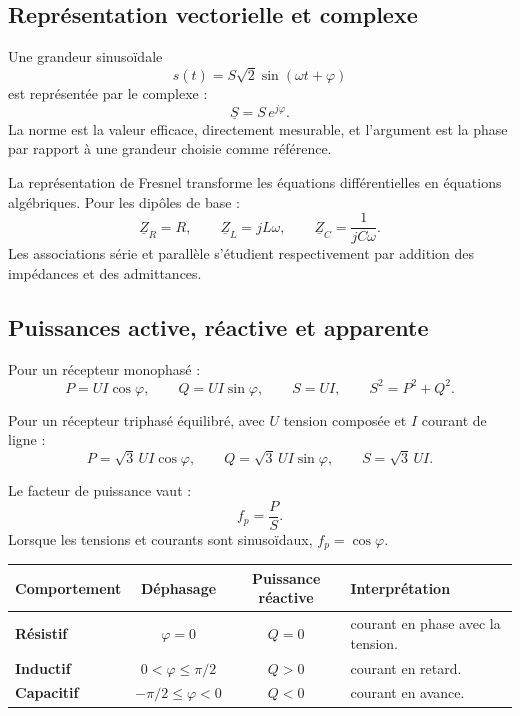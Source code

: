 \subsection{Représentation vectorielle et complexe}

Une grandeur sinusoïdale
\[
s(t)=S\sqrt2\sin(\omega t+\varphi)
\]
est représentée par le complexe :
\[
\boxed{\underline S=S\,e^{j\varphi}.}
\]
La norme est la valeur efficace, directement mesurable, et l'argument est la phase par rapport à une grandeur choisie comme référence.

\begin{center}\TLTriphasageVectoriel\end{center}

La représentation de Fresnel transforme les équations différentielles en équations algébriques. Pour les dipôles de base :
\[
\underline Z_R=R,
\qquad
\underline Z_L=jL\omega,
\qquad
\underline Z_C=\frac{1}{jC\omega}.
\]
Les associations série et parallèle s'étudient respectivement par addition des impédances et des admittances.


\subsection{Puissances active, réactive et apparente}

Pour un récepteur monophasé :
\[
P=UI\cos\varphi,
\qquad
Q=UI\sin\varphi,
\qquad
S=UI,
\qquad
S^2=P^2+Q^2.
\]

Pour un récepteur triphasé équilibré, avec $U$ tension composée et $I$ courant de ligne :
\[
\boxed{P=\sqrt3\,UI\cos\varphi,}
\qquad
\boxed{Q=\sqrt3\,UI\sin\varphi,}
\qquad
\boxed{S=\sqrt3\,UI.}
\]

Le facteur de puissance vaut :
\[
f_p=\frac{P}{S}.
\]
Lorsque les tensions et courants sont sinusoïdaux, $f_p=\cos\varphi$.

\begin{center}
\small
\begin{tabularx}{\linewidth}{>{\bfseries}l c c X}
\toprule
Comportement & Déphasage & Puissance réactive & Interprétation \\
\midrule
Résistif & $\varphi=0$ & $Q=0$ & courant en phase avec la tension.\\
Inductif & $0<\varphi\leq\pi/2$ & $Q>0$ & courant en retard.\\
Capacitif & $-\pi/2\leq\varphi<0$ & $Q<0$ & courant en avance.\\
\bottomrule
\end{tabularx}
\end{center}

